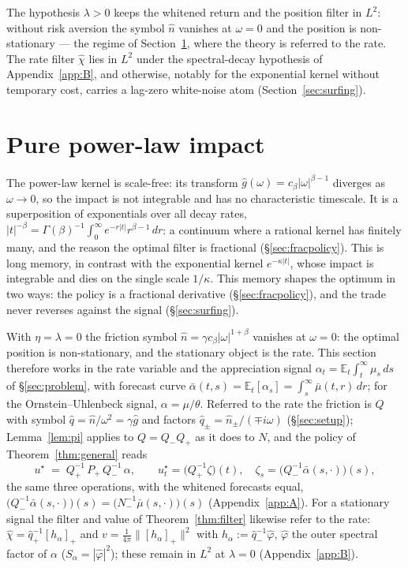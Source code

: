 \documentclass[11pt]{article}
\newcommand{\E}{\mathbb{E}}
\newcommand{\pluspart}[1]{\left[#1\right]_+}
\theoremstyle{plain}
\theoremstyle{definition}
\theoremstyle{remark}
\begin{document}
The hypothesis $\lambda>0$ keeps the whitened return and the position filter in $L^2$: without risk aversion the symbol $\hat n$ vanishes at $\omega=0$ and the position is non-stationary --- the regime of Section~\ref{sec:fractional}, where the theory is referred to the rate. The rate filter $\hat\chi$ lies in $L^2$ under the spectral-decay hypothesis of Appendix~\ref{app:B}, and otherwise, notably for the exponential kernel without temporary cost, carries a lag-zero white-noise atom (Section~\ref{sec:surfing}).

\section{Pure power-law impact}\label{sec:fractional}

The power-law kernel is scale-free: its transform $\hat g(\omega)=c_\beta|\omega|^{\beta-1}$ diverges as $\omega\to0$, so the impact is not integrable and has no characteristic timescale. It is a superposition of exponentials over all decay rates, $|t|^{-\beta}=\Gamma(\beta)^{-1}\int_0^\infty e^{-r|t|}r^{\beta-1}\,dr$: a continuum where a rational kernel has finitely many, and the reason the optimal filter is fractional (\S\ref{sec:fracpolicy}). This is long memory, in contrast with the exponential kernel $e^{-\kappa|t|}$, whose impact is integrable and dies on the single scale $1/\kappa$. This memory shapes the optimum in two ways: the policy is a fractional derivative (\S\ref{sec:fracpolicy}), and the trade never reverses against the signal (\S\ref{sec:surfing}).

With $\eta=\lambda=0$ the friction symbol $\hat n=\gamma c_\beta|\omega|^{1+\beta}$ vanishes at $\omega=0$: the optimal position is non-stationary, and the stationary object is the rate. This section therefore works in the rate variable and the appreciation signal $\alpha_t=\E_t\int_t^\infty\mu_s\,ds$ of \S\ref{sec:problem}, with forecast curve $\bar\alpha(t,s)=\E_t[\alpha_s]=\int_s^\infty\bar\mu(t,r)\,dr$; for the Ornstein--Uhlenbeck signal, $\alpha=\mu/\theta$. Referred to the rate the friction is $Q$ with symbol $\hat q=\hat n/\omega^2=\gamma\hat g$ and factors $\hat q_\pm=\hat n_\pm/(\mp i\omega)$ (\S\ref{sec:setup}); Lemma~\ref{lem:pi} applies to $Q=Q_-Q_+$ as it does to $N$, and the policy of Theorem~\ref{thm:general} reads
\begin{equation}\label{eq:rate-policy}
u^\star \;=\; Q_+^{-1}\,P_+\,Q_-^{-1}\,\alpha,
\qquad
u^\star_t=\bigl(Q_+^{-1}\zeta\bigr)(t),\quad \zeta_s=\bigl(Q_-^{-1}\bar\alpha(s,\cdot)\bigr)(s),
\end{equation}
the same three operations, with the whitened forecasts equal, $\bigl(Q_-^{-1}\bar\alpha(s,\cdot)\bigr)(s)=\bigl(N_-^{-1}\bar\mu(s,\cdot)\bigr)(s)$ (Appendix~\ref{app:A}). For a stationary signal the filter and value of Theorem~\ref{thm:filter} likewise refer to the rate: $\hat\chi=\hat q_+^{-1}\pluspart{h_\alpha}$ and $v=\frac{1}{4\pi}\|\pluspart{h_\alpha}\|^2$ with $h_\alpha:=\hat q_-^{-1}\hat\varphi$, $\hat\varphi$ the outer spectral factor of $\alpha$ ($S_\alpha=|\hat\varphi|^2$); these remain in $L^2$ at $\lambda=0$ (Appendix~\ref{app:B}).
\end{document}
